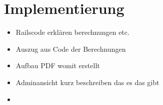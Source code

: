 \part{Implementierung}
\begin{itemize}
 \item Railscode erkl\"aren berechnungen etc.
 \item Auszug aus Code der Berechnungen
 \item Aufbau PDF womit erstellt
 \item Adminansicht kurz beschreiben das es das gibt
 \item 
\end{itemize}

